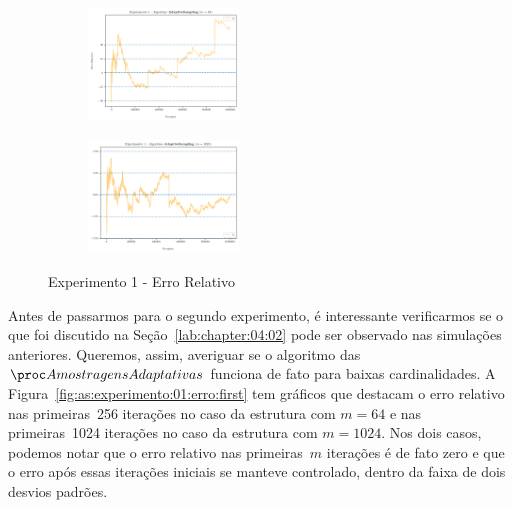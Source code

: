 \begin{figure}
  \centering
  \captionsetup{justification=centering,margin=2cm}
  \begin{subfigure}{.5\textwidth}
    \centering
    \includegraphics[width=\linewidth, height=3cm]{figuras/adaptive_sampling_erro_full_64.png}
  \end{subfigure}%
  \begin{subfigure}{.5\textwidth}
    \centering
    \includegraphics[width=\linewidth, height=3cm]{figuras/adaptive_sampling_erro_full_1024.png}
  \end{subfigure}
  \caption{Experimento 1 - Erro Relativo}
  \label{fig:as:experimento:01:erro}
\end{figure}

\newpage
Antes de passarmos para o segundo experimento, é interessante verificarmos se o que foi discutido na 
Seção~\ref{lab:chapter:04:02} pode ser observado nas simulações anteriores. Queremos, assim, averiguar se o algoritmo 
das~$\asampling$ funciona de fato para baixas cardinalidades. A Figura~\ref{fig:as:experimento:01:erro:first} tem
gráficos que destacam o erro relativo nas primeiras~256 iterações no caso da estrutura com $m = 64$ e nas primeiras~1024
iterações no caso da estrutura com $m = 1024$. Nos dois casos, podemos notar que o erro relativo nas primeiras~$m$ 
iterações é de fato zero e que o erro após essas iterações iniciais se manteve controlado, dentro da faixa de dois 
desvios padrões.


